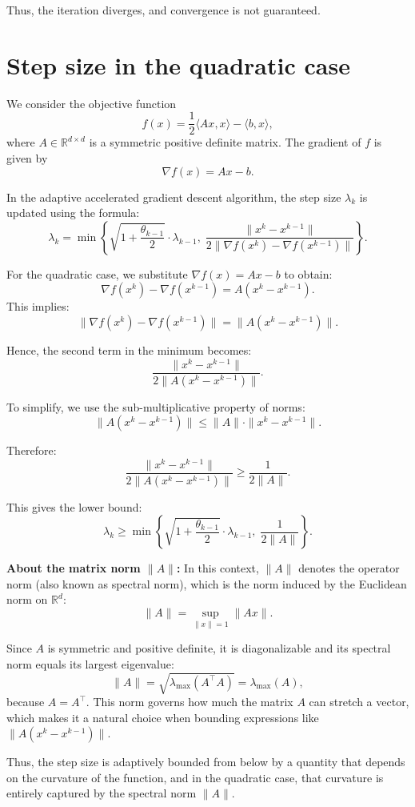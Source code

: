 \documentclass[12pt]{article}
\begin{document}
Thus, the iteration diverges, and convergence is not guaranteed.

\section*{Step size in the quadratic case}

We consider the objective function
\[
f(x) = \frac{1}{2} \langle Ax, x \rangle - \langle b, x \rangle,
\]
where \( A \in \mathbb{R}^{d \times d} \) is a symmetric positive definite matrix. The gradient of \( f \) is given by
\[
\nabla f(x) = Ax - b.
\]

In the adaptive accelerated gradient descent algorithm, the step size \( \lambda_k \) is updated using the formula:
\[
\lambda_k = \min \left\{ \sqrt{1 + \frac{\theta_{k-1}}{2}} \cdot \lambda_{k-1}, \; \frac{ \|x^k - x^{k-1} \| }{ 2 \| \nabla f(x^k) - \nabla f(x^{k-1}) \| } \right\}.
\]

For the quadratic case, we substitute \( \nabla f(x) = Ax - b \) to obtain:
\[
\nabla f(x^k) - \nabla f(x^{k-1}) = A(x^k - x^{k-1}).
\]
This implies:
\[
\| \nabla f(x^k) - \nabla f(x^{k-1}) \| = \| A(x^k - x^{k-1}) \|.
\]

Hence, the second term in the minimum becomes:
\[
\frac{ \| x^k - x^{k-1} \| }{ 2 \| A(x^k - x^{k-1}) \| }.
\]

To simplify, we use the sub-multiplicative property of norms:
\[
\| A(x^k - x^{k-1}) \| \leq \| A \| \cdot \| x^k - x^{k-1} \|.
\]

Therefore:
\[
\frac{ \| x^k - x^{k-1} \| }{ 2 \| A(x^k - x^{k-1}) \| } \geq \frac{1}{2 \| A \| }.
\]

This gives the lower bound:
\[
\lambda_k \geq \min \left\{ \sqrt{1 + \frac{\theta_{k-1}}{2}} \cdot \lambda_{k-1}, \; \frac{1}{2 \| A \| } \right\}.
\]

\textbf{About the matrix norm \( \| A \| \):}  
In this context, \( \| A \| \) denotes the operator norm (also known as spectral norm), which is the norm induced by the Euclidean norm on \( \mathbb{R}^d \):
\[
\| A \| = \sup_{\|x\| = 1} \|Ax\|.
\]

Since \( A \) is symmetric and positive definite, it is diagonalizable and its spectral norm equals its largest eigenvalue:
\[
\| A \| = \sqrt{\lambda_{\max}(A^\top A)} = \lambda_{\max}(A),
\]
because \( A = A^\top \). This norm governs how much the matrix \( A \) can stretch a vector, which makes it a natural choice when bounding expressions like \( \| A(x^k - x^{k-1}) \| \).

Thus, the step size is adaptively bounded from below by a quantity that depends on the curvature of the function, and in the quadratic case, that curvature is entirely captured by the spectral norm \( \| A \| \).
\end{document}
